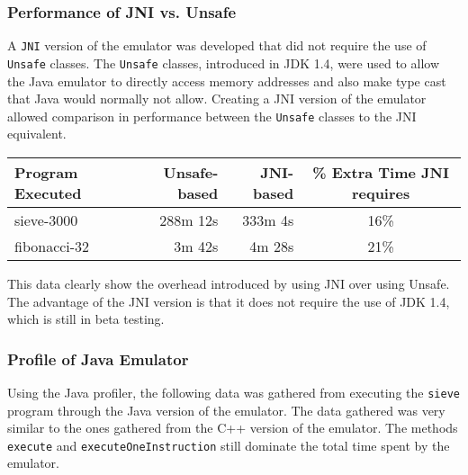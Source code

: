 \subsubsection*{Performance of JNI vs. Unsafe}

A \verb!JNI! version of the emulator was developed that did not require
the use of \verb!Unsafe! classes. The \verb!Unsafe! classes, introduced in
JDK 1.4, were used to allow the Java emulator to directly access memory
addresses and also make type cast that Java would normally not allow.
Creating a JNI version of the emulator allowed comparison in performance
between the \verb!Unsafe! classes to the JNI equivalent.

\centerfigbegin
{
\begin{tabular}{|l|r|r|c|} \hline
Program Executed	& Unsafe-based 	& JNI-based & \% Extra Time JNI requires\\ \hline
sieve-3000 		& 288m 12s	& 333m 4s 	& 16\% \\
fibonacci-32		& 3m 42s 	& 4m 28s 	& 21\%  \\
\hline
\end{tabular}
}

This data clearly show the overhead introduced by using JNI over using
Unsafe. The advantage of the JNI version is that it does not require the
use of JDK 1.4, which is still in beta testing.


\subsubsection*{Profile of Java Emulator}

Using the Java profiler, the following data was gathered from executing
the \verb!sieve! program through the Java version of the emulator. The
data gathered was very similar to the ones gathered from the C++ version
of the emulator. The methods \verb!execute! and
\verb!executeOneInstruction! still dominate the total time spent by the
emulator.

